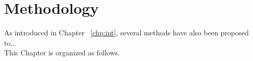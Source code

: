 \chapter{Methodology} \label{chp:models}

As introduced in Chapter ~\ref{chp:int}, several methods have also been proposed to...\\
This Chapter is organized as follows.

